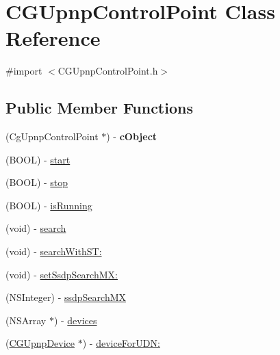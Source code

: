 \hypertarget{interface_c_g_upnp_control_point}{\section{C\-G\-Upnp\-Control\-Point Class Reference}
\label{interface_c_g_upnp_control_point}
}


{\ttfamily \#import $<$C\-G\-Upnp\-Control\-Point.\-h$>$}

\subsection*{Public Member Functions}
\begin{DoxyCompactItemize}
\item 
\hypertarget{interface_c_g_upnp_control_point_a1bff5a9263d6e3e26a9d76dea838ac22}{(Cg\-Upnp\-Control\-Point $\ast$) -\/ {\bfseries c\-Object}}\label{interface_c_g_upnp_control_point_a1bff5a9263d6e3e26a9d76dea838ac22}

\item 
(B\-O\-O\-L) -\/ \hyperlink{interface_c_g_upnp_control_point_a2fa0d2fe4287bf9e6596d634ae800683}{start}
\item 
(B\-O\-O\-L) -\/ \hyperlink{interface_c_g_upnp_control_point_ace4a1a10baa3f893752a9f18b1d24cc5}{stop}
\item 
(B\-O\-O\-L) -\/ \hyperlink{interface_c_g_upnp_control_point_a52e1f9d239f219773ee44275371cad77}{is\-Running}
\item 
(void) -\/ \hyperlink{interface_c_g_upnp_control_point_aa2ecd4b95780704d69b82012edce7672}{search}
\item 
(void) -\/ \hyperlink{interface_c_g_upnp_control_point_a766273ced74e85a91375d387ae90150f}{search\-With\-S\-T\-:}
\item 
(void) -\/ \hyperlink{interface_c_g_upnp_control_point_a5b4385e5396b29cd66cca675e6bd652b}{set\-Ssdp\-Search\-M\-X\-:}
\item 
(N\-S\-Integer) -\/ \hyperlink{interface_c_g_upnp_control_point_a4307ef982016c001f7ba065cbe2f04a9}{ssdp\-Search\-M\-X}
\item 
(N\-S\-Array $\ast$) -\/ \hyperlink{interface_c_g_upnp_control_point_ae344dfa94337e21f1f1e4bb9c4004fbc}{devices}
\item 
(\hyperlink{interface_c_g_upnp_device}{C\-G\-Upnp\-Device} $\ast$) -\/ \hyperlink{interface_c_g_upnp_control_point_a7547ad1c5da99994b87498e9f845498c}{device\-For\-U\-D\-N\-:}
\end{DoxyCompactItemize}
